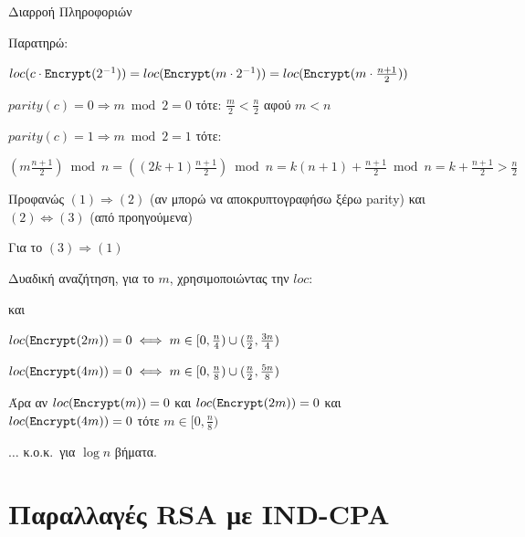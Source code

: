 \documentclass[handout]{beamer}
\begin{document}
\begin{frame}[allowframebreaks]{Διαρροή Πληροφοριών}
\medskip

\framebreak



Παρατηρώ:

$loc( c \cdot \mathtt{Encrypt}(2^{-1})) = loc(\mathtt{Encrypt}(m \cdot 2^{-1}))  = loc(\mathtt{Encrypt}(m \cdot \frac{n+1}{2}))$ 

\medskip
$parity(c) = 0 \Rightarrow m \bmod 2 =0$  τότε:
$ \frac{m}{2}   < \frac{n}{2} $ αφού $m<n$

\medskip
$parity(c) = 1 \Rightarrow m \bmod 2 =1$  τότε:

$(m \frac{n+1}{2}) \bmod n  = ( (2 k +1) \frac{n+1}{2}) \bmod n  =  k (n+1) + \frac{n+1}{2} \bmod n 
= k + \frac{n+1}{2} > \frac{n}{2}$

\framebreak


Προφανώς $(1) \Rightarrow (2)$ (αν μπορώ να αποκρυπτογραφήσω ξέρω parity) και $(2) \Leftrightarrow (3)$ (από προηγούμενα)

Για το $(3) \Rightarrow (1)$

Δυαδική αναζήτηση, για το $m$, χρησιμοποιώντας την $loc$:

\magenta{$loc(\enc(m)) = 0 \iff m \in [0, \frac{n}{2})$} και 

$loc(\mathtt{Encrypt}(2m)) = 0 \iff m \in [0, \frac{n}{4}) \cup (\frac{n}{2}, \frac{3n}{4})$ 

$loc(\mathtt{Encrypt}(4m)) = 0 \iff m \in [0, \frac{n}{8}) \cup (\frac{n}{2}, \frac{5n}{8}) $ 

Άρα αν $loc(\mathtt{Encrypt}(m)) = 0$ και $loc(\mathtt{Encrypt}(2m)) = 0$ και $loc(\mathtt{Encrypt}(4m)) = 0$ τότε $m \in [0, \frac{n}{8})$

$\ldots$ κ.ο.κ.\ για $\log n$ βήματα. 

\end{frame}

\section{Παραλλαγές RSA με IND-CPA}
\end{document}
